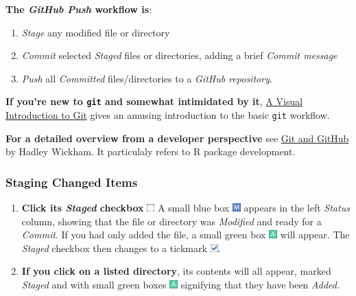 \documentclass[]{book}
\providecommand{\tightlist}{%
  \setlength{\itemsep}{0pt}\setlength{\parskip}{0pt}}
\theoremstyle{definition}
\theoremstyle{definition}
\theoremstyle{definition}
\theoremstyle{remark}
\begin{document}
\textbf{The \emph{GitHub Push} workflow is}:

\begin{enumerate}
\def\labelenumi{\arabic{enumi}.}
\tightlist
\item
  \emph{Stage} any modified file or directory
\item
  \emph{Commit} selected \emph{Staged} files or directories, adding a
  brief \emph{Commit message}
\item
  \emph{Push} all \emph{Committed} files/directories to a \emph{GitHub
  repository}.
\end{enumerate}

\textbf{If you're new to \texttt{git} and somewhat intimidated by it},
\href{https://medium.com/@ashk3l/a-visual-introduction-to-git-9fdca5d3b43a}{A
Visual Introduction to Git} gives an amusing introduction to the basic
\texttt{git} workflow.

\textbf{For a detailed overview from a developer perspective} see
\href{http://r-pkgs.had.co.nz/git.html}{Git and GitHub} by Hadley
Wickham. It particulaly refers to R package development.

\hypertarget{staging-changed-items}{%
\subsubsection{Staging Changed Items}\label{staging-changed-items}}

\begin{enumerate}
\def\labelenumi{\arabic{enumi}.}
\item
  \textbf{Click its \emph{Staged} checkbox}
  \includegraphics{images/git-blank-button.png} A small blue box
  \includegraphics{images/git-blue-M.png} appears in the left
  \emph{Status} column, showing that the file or directory was
  \emph{Modified} and ready for a \emph{Commit}. If you had only added
  the file, a small green box \includegraphics{images/git-green-A.png}
  will appear. The \emph{Staged} checkbox then changes to a tickmark
  \includegraphics{images/git-check-button.png}.
\item
  \textbf{If you click on a listed directory}, its contents will all
  appear, marked \emph{Staged} and with small green boxes
  \includegraphics{images/git-green-A.png} signifying that they have
  been \emph{Added.}
\end{enumerate}
\end{document}
